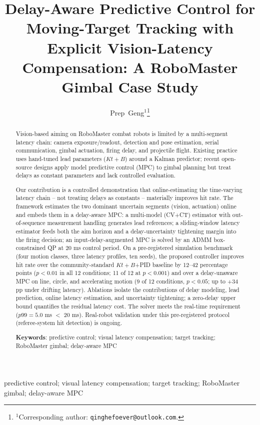 \documentclass[journal]{IEEEtran}
\begin{document}
\title{Delay-Aware Predictive Control for Moving-Target Tracking with Explicit Vision-Latency Compensation: A RoboMaster Gimbal Case Study}
\author{Prep~Geng$^{1}$\thanks{$^{1}$Corresponding author: \texttt{qinghefoever@outlook.com}.}}
\maketitle

\begin{abstract}

Vision-based aiming on RoboMaster combat robots is limited by a multi-segment latency chain: camera exposure/readout, detection and pose estimation, serial communication, gimbal actuation, firing delay, and projectile flight. Existing practice uses hand-tuned lead parameters ($Kt+B$) around a Kalman predictor; recent open-source designs apply model predictive control (MPC) to gimbal planning but treat delays as constant parameters and lack controlled evaluation.

Our contribution is a controlled demonstration that online-estimating the time-varying latency chain -- not treating delays as constants -- materially improves hit rate. The framework estimates the two dominant uncertain segments (vision, actuation) online and embeds them in a delay-aware MPC: a multi-model (CV+CT) estimator with out-of-sequence measurement handling generates lead references; a sliding-window latency estimator feeds both the aim horizon and a delay-uncertainty tightening margin into the firing decision; an input-delay-augmented MPC is solved by an ADMM box-constrained QP at $20$ ms control period. On a pre-registered simulation benchmark (four motion classes, three latency profiles, ten seeds), the proposed controller improves hit rate over the community-standard $Kt+B$+PID baseline by 12--42 percentage points ($p<0.01$ in all 12 conditions; 11 of 12 at $p<0.001$) and over a delay-unaware MPC on line, circle, and accelerating motion (9 of 12 conditions, $p<0.05$; up to $+34$ pp under drifting latency). Ablations isolate the contributions of delay modeling, lead prediction, online latency estimation, and uncertainty tightening; a zero-delay upper bound quantifies the residual latency cost. The solver meets the real-time requirement ($p99=5.0$ ms $<$ 20 ms). Real-robot validation under this pre-registered protocol (referee-system hit detection) is ongoing.

\textbf{Keywords}: predictive control; visual latency compensation; target tracking; RoboMaster gimbal; delay-aware MPC
\end{abstract}
\begin{IEEEkeywords} predictive control; visual latency compensation; target tracking; RoboMaster gimbal; delay-aware MPC \end{IEEEkeywords}
\end{document}

